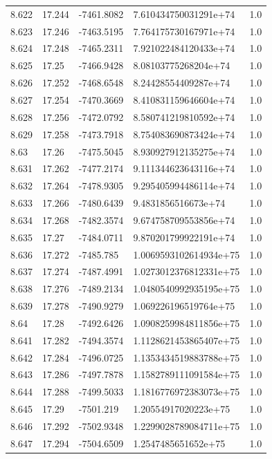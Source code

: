 \begin{tabular}{lllll}
8.622 & 17.244 & -7461.8082 & 7.610434750031291e+74 & 1.0 \\
8.623 & 17.246 & -7463.5195 & 7.764175730167971e+74 & 1.0 \\
8.624 & 17.248 & -7465.2311 & 7.921022484120433e+74 & 1.0 \\
8.625 & 17.25 & -7466.9428 & 8.08103775268204e+74 & 1.0 \\
8.626 & 17.252 & -7468.6548 & 8.24428554409287e+74 & 1.0 \\
8.627 & 17.254 & -7470.3669 & 8.410831159646604e+74 & 1.0 \\
8.628 & 17.256 & -7472.0792 & 8.580741219810592e+74 & 1.0 \\
8.629 & 17.258 & -7473.7918 & 8.754083690873424e+74 & 1.0 \\
8.63 & 17.26 & -7475.5045 & 8.930927912135275e+74 & 1.0 \\
8.631 & 17.262 & -7477.2174 & 9.111344623643116e+74 & 1.0 \\
8.632 & 17.264 & -7478.9305 & 9.295405994486114e+74 & 1.0 \\
8.633 & 17.266 & -7480.6439 & 9.4831856516673e+74 & 1.0 \\
8.634 & 17.268 & -7482.3574 & 9.674758709553856e+74 & 1.0 \\
8.635 & 17.27 & -7484.0711 & 9.870201799922191e+74 & 1.0 \\
8.636 & 17.272 & -7485.785 & 1.0069593102614934e+75 & 1.0 \\
8.637 & 17.274 & -7487.4991 & 1.0273012376812331e+75 & 1.0 \\
8.638 & 17.276 & -7489.2134 & 1.0480540992935195e+75 & 1.0 \\
8.639 & 17.278 & -7490.9279 & 1.069226196519764e+75 & 1.0 \\
8.64 & 17.28 & -7492.6426 & 1.0908259984811856e+75 & 1.0 \\
8.641 & 17.282 & -7494.3574 & 1.1128621453865407e+75 & 1.0 \\
8.642 & 17.284 & -7496.0725 & 1.1353434519883788e+75 & 1.0 \\
8.643 & 17.286 & -7497.7878 & 1.1582789111091584e+75 & 1.0 \\
8.644 & 17.288 & -7499.5033 & 1.1816776972383073e+75 & 1.0 \\
8.645 & 17.29 & -7501.219 & 1.20554917020223e+75 & 1.0 \\
8.646 & 17.292 & -7502.9348 & 1.2299028789084711e+75 & 1.0 \\
8.647 & 17.294 & -7504.6509 & 1.2547485651652e+75 & 1.0 \\

\end{tabular}
